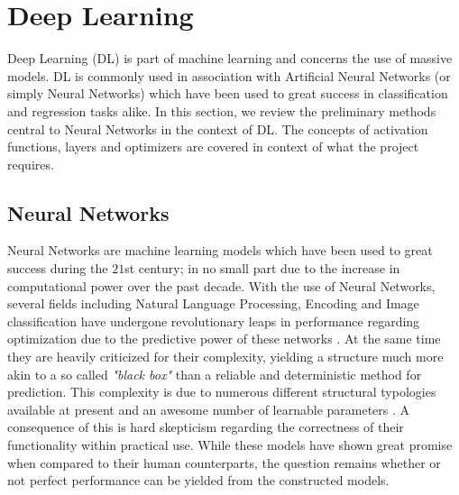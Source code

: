 \section{Deep Learning}

Deep Learning (DL) is part of machine learning and concerns the use of massive models. DL is commonly used in association with Artificial Neural Networks (or simply Neural Networks) which have been used to great success in classification and regression tasks alike. In this section, we review the preliminary methods central to Neural Networks in the context of DL. The concepts of activation functions, layers and optimizers are covered in context of what the project requires. 

\subsection{Neural Networks}
Neural Networks are machine learning models which have been used to great success during the $21$st century; in no small part due to the increase in computational power over the past decade. With the use of Neural Networks, several fields including Natural Language Processing, Encoding and Image classification have undergone revolutionary leaps in performance regarding optimization due to the predictive power of these networks \cite{sharir2020cost, kukacka2012overview, zhang2015deep, lee2017deep}. At the same time they are heavily criticized for their complexity, yielding a structure much more akin to a so called \textit{"black box"} than a reliable and deterministic method for prediction. This complexity is due to numerous different structural typologies available at present and an awesome number of learnable parameters \cite{qiu2004opening}. A consequence of this is hard skepticism regarding the correctness of their functionality within practical use. While these models have shown great promise when compared to their human counterparts, the question remains whether or not perfect performance can be yielded from the constructed models.

